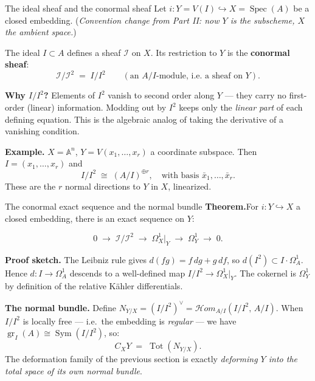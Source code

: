 \documentclass[aspectratio=169,12pt]{beamer}
\newenvironment{mathbox}{%
  \begin{tcolorbox}[mathbox]}{%
  \end{tcolorbox}}
\begin{document}
\begin{frame}{The ideal sheaf and the conormal sheaf}
  Let $i : Y = V(I) \hookrightarrow X = \operatorname{Spec}(A)$ be a closed embedding.
  (\emph{Convention change from Part II: now $Y$ is the subscheme, $X$ the ambient space.})

  \smallskip

  The ideal $I \subset A$ defines a sheaf $\mathcal{I}$ on $X$.
  Its restriction to $Y$ is the \textbf{conormal sheaf}:
  \[
    \mathcal{I}/\mathcal{I}^2 \;=\; I/I^2
    \qquad (\text{an } A/I\text{-module, i.e.\ a sheaf on } Y).
  \]

  \textbf{Why $I/I^2$?}\enspace
  Elements of $I^2$ vanish to second order along $Y$ — they carry no
  first-order (linear) information.
  Modding out by $I^2$ keeps only the \emph{linear part} of each defining
  equation.
  This is the algebraic analog of taking the derivative of a vanishing condition.

  \medskip

  \textbf{Example.}\enspace
  $X = \mathbb{A}^n$, $Y = V(x_1, \ldots, x_r)$ a coordinate subspace.
  Then $I = (x_1, \ldots, x_r)$ and
  \[
    I/I^2 \;\cong\; (A/I)^{\oplus r},
    \quad\text{with basis } \bar{x}_1, \ldots, \bar{x}_r.
  \]
  These are the $r$ normal directions to $Y$ in $X$, linearized.
\end{frame}

\begin{frame}{The conormal exact sequence and the normal bundle}
  \textbf{Theorem.}\enspace For $i : Y \hookrightarrow X$ a closed embedding,
  there is an exact sequence on $Y$:
  \begin{mathbox}
  \[
    0 \;\longrightarrow\; \mathcal{I}/\mathcal{I}^2
      \;\longrightarrow\; \Omega^1_X\big|_Y
      \;\longrightarrow\; \Omega^1_Y
      \;\longrightarrow\; 0.
  \]
  \end{mathbox}

  \textbf{Proof sketch.}\enspace
  The Leibniz rule gives $d(fg) = f\,dg + g\,df$, so
  $d(I^2) \subset I \cdot \Omega^1_A$.
  Hence $d : I \to \Omega^1_A$ descends to a well-defined map
  $I/I^2 \to \Omega^1_X|_Y$. The cokernel is $\Omega^1_Y$ by definition of
  the relative K\"{a}hler differentials.

  \medskip

  \textbf{The normal bundle.}\enspace
  Define $N_{Y/X} = (I/I^2)^\vee = \mathcal{H}om_{A/I}(I/I^2,\, A/I)$.
  When $I/I^2$ is locally free — i.e.\ the embedding is \emph{regular} —
  we have $\operatorname{gr}_I(A) \cong \operatorname{Sym}(I/I^2)$, so:
  \[
    C_X Y \;=\; \operatorname{Tot}(N_{Y/X}).
  \]
  The deformation family of the previous section is exactly
  \emph{deforming $Y$ into the total space of its own normal bundle}.
\end{frame}
\end{document}
